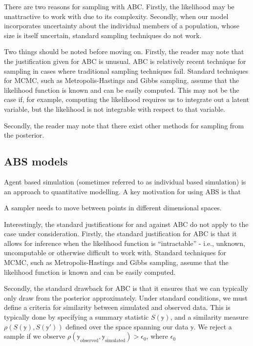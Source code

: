\documentclass[
]{book}
\begin{document}
There are two reasons for sampling with ABC. Firstly, the likelihood may be unattractive to work with due to its complexity. Secondly, when our model incorporates uncertainty about the individual members of a population, whose size is itself uncertain, standard sampling techniques do not work.

Two things should be noted before moving on. Firstly, the reader may note that the justification given for ABC is unusual. ABC is relatively recent technique for sampling in cases where traditional sampling techniques fail. Standard techniques for MCMC, such as Metropolis-Hastings and Gibbs sampling, assume that the likelihood function is known and can be easily computed. This may not be the case if, for example, computing the likelihood requires us to integrate out a latent variable, but the likelihood is not integrable with respect to that variable.

Secondly, the reader may note that there exist other methods for sampling from the posterior.

\hypertarget{abs-models}{%
\subsection{ABS models}\label{abs-models}}

Agent based simulation (sometimes referred to as individual based simulation) is an approach to quantitative modelling. A key motivation for using ABS is that

A sampler needs to move between points in different dimensional spaces.

Interestingly, the standard justifications for and against ABC do not apply to the case under consideration. Firstly, the standard justification for ABC is that it allows for inference when the likelihood function is ``intractable'' - i.e., unknown, uncomputable or otherwise difficult to work with. Standard techniques for MCMC, such as Metropolis-Hastings and Gibbs sampling, assume that the likelihood function is known and can be easily computed.

Secondly, the standard drawback for ABC is that it ensures that we can typically only draw from the posterior approximately. Under standard conditions, we must define a criteria for similarity between simulated and observed data. This is typically done by specifying a summary statistic \(S(\mathbb y)\), and a similarity measure \(\rho(S(\mathbb y), S(\mathbb y'))\) defined over the space spanning our data \(\mathbb y\). We reject a sample if we observe \(\rho(\mathbb y_{\text{observed}}, \mathbb y_{\text{simulated}} ) > \epsilon_0\), where \(\epsilon_0\)
\end{document}

